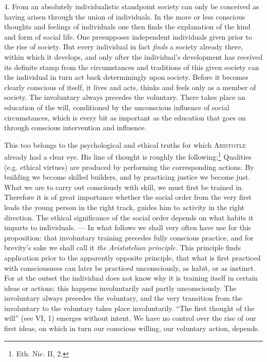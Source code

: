 \documentclass[12pt,a4paper,openany]{book}
\newcommand{\opage}[1]{\marginnote{\footnotesize\textit{[#1]}}}
\begin{document}
4. From an absolutely individualistic standpoint society can only be conceived as having arisen through the union of
individuals. In the more or less conscious thoughts and feelings of individuals
\opage{267}one then finds the explanation of the kind and form of social life. One presupposes independent individuals
given prior to the rise of society. But every individual in fact \textit{finds} a society already there, within which
it develops, and only after the individual's development has received its definite stamp from the circumstances and
traditions of this given society can the individual in turn act back determiningly upon society. Before it becomes
clearly conscious of itself, it lives and acts, thinks and feels only as a member of society. The involuntary always
precedes the voluntary. There takes place an education of the will, conditioned by the unconscious influence of social
circumstances, which is every bit as important as the education that goes on through conscious intervention and
influence.

This too belongs to the psychological and ethical truths for which \textsc{Aristotle} already had a clear eye. His line
of thought is roughly the following:\footnote[1]{Eth. Nic. II, 2.} Qualities (e.g. ethical virtues) are produced by
performing the corresponding actions. By building we become skilled builders, and by practicing justice we become just.
What we are to carry out consciously with skill, we must first be trained in. Therefore it is of great importance
whether the social order from the very first leads the young person in the right track, guides him to activity in the
right direction. The ethical significance of the social order depends on what habits it imparts to individuals. --- In
what follows we shall very often have use for this proposition: that involuntary training precedes fully conscious
practice, and for brevity's sake we shall call it \textit{the Aristotelian principle.} This principle finds application
prior to the apparently opposite principle, that what is first practiced with consciousness can later be practiced
unconsciously, as habit, or as instinct. For at the outset the individual does not know why it is training itself in
certain ideas or actions; this happens involuntarily and partly unconsciously. The involuntary always precedes the
voluntary, and the very transition from the involuntary to the voluntary takes place involuntarily. ``The first thought
of the will'' (see VI, 1) emerges without intent. We
\opage{268}have no control over the rise of our first ideas, on which in turn our conscious willing, our voluntary
action, depends.
\end{document}
